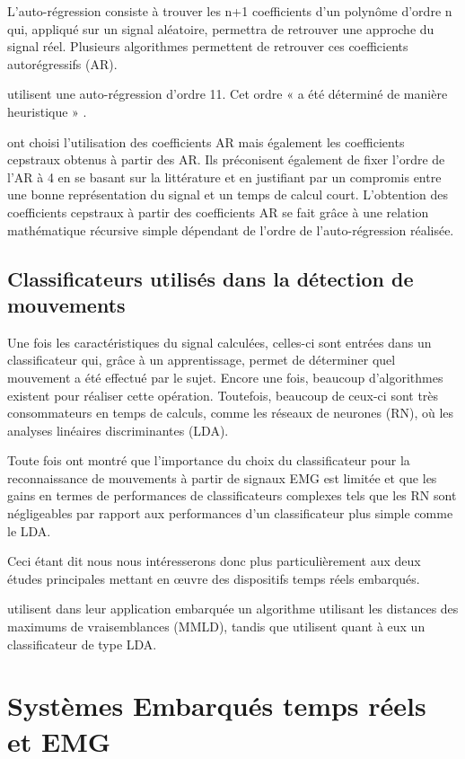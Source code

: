 \documentclass[letterpaper, twoside, 12pt, memoire, creativecommons, hyperref]{thETS}
\begin{document}
L’auto-régression consiste à trouver les n+1 coefficients d’un polynôme d’ordre n qui, appliqué sur un signal aléatoire, permettra de retrouver une approche du signal réel. Plusieurs algorithmes permettent de retrouver ces coefficients autorégressifs (AR).

\cite{Peleg2002} utilisent une auto-régression d’ordre 11. Cet ordre « a été déterminé de manière heuristique » \citep{Peleg2002}.

\cite{Chang1996} ont choisi l'utilisation des coefficients AR mais également les coefficients cepstraux obtenus à partir des AR. Ils préconisent également de fixer l’ordre de l’AR à 4 en se basant sur la littérature et en justifiant par un compromis entre une bonne représentation du signal  et un temps de calcul court. 
L’obtention des coefficients cepstraux à partir des coefficients AR se fait grâce à une relation mathématique récursive simple dépendant de l’ordre de l'auto-régression réalisée. 


\subsection{Classificateurs utilisés dans la détection de mouvements}

Une fois les caractéristiques du signal calculées,  celles-ci sont entrées dans un classificateur qui, grâce à un apprentissage, permet de déterminer quel mouvement a été effectué par le sujet. Encore une fois, beaucoup d’algorithmes existent pour réaliser cette opération. Toutefois, beaucoup de ceux-ci sont très consommateurs en temps de calculs, comme les réseaux de neurones (RN), où les analyses linéaires discriminantes (LDA). 

Toute fois \cite{englehart1999} ont montré que l'importance du choix du classificateur pour la reconnaissance de mouvements à partir de signaux EMG est limitée et que les gains en termes de performances de classificateurs complexes tels que les RN sont négligeables par rapport aux performances d'un classificateur plus simple comme le LDA.

Ceci étant dit nous nous intéresserons donc plus particulièrement aux deux études principales mettant en œuvre des dispositifs temps réels embarqués.

\cite{Chang1996} utilisent dans leur application embarquée un algorithme utilisant les distances des maximums de vraisemblances (MMLD), tandis que \cite{Tenore2007} utilisent quant à eux un classificateur de type LDA.


\section{Systèmes Embarqués temps réels et EMG}
\end{document}
